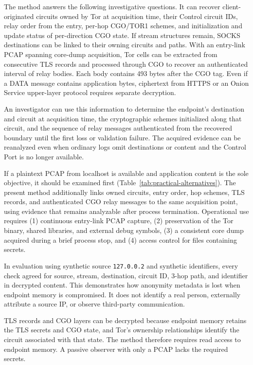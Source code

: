 \documentclass[10pt,a4paper]{article}
\newcommand{\code}[1]{\nolinkurl{#1}}
\newcommand{\torone}{\textsc{TOR1}}
\begin{document}
The method answers the following investigative questions.
It can recover client-originated circuits owned by Tor at acquisition time, their Control circuit IDs, relay order from the entry, per-hop CGO/\torone{} schemes, and initialization and update status of per-direction CGO state.
If stream structures remain, SOCKS destinations can be linked to their owning circuits and paths.
With an entry-link PCAP spanning core-dump acquisition, Tor cells can be extracted from consecutive TLS records and processed through CGO to recover an authenticated interval of relay bodies. Each body contains 493 bytes after the CGO tag. Even if a DATA message contains application bytes, ciphertext from HTTPS or an Onion Service upper-layer protocol requires separate decryption.

An investigator can use this information to determine the endpoint's destination and circuit at acquisition time, the cryptographic schemes initialized along that circuit, and the sequence of relay messages authenticated from the recovered boundary until the first loss or validation failure.
The acquired evidence can be reanalyzed even when ordinary logs omit destinations or content and the Control Port is no longer available.

If a plaintext PCAP from localhost is available and application content is the sole objective, it should be examined first (Table~\ref{tab:practical-alternatives}). The present method additionally links owned circuits, entry order, hop schemes, TLS records, and authenticated CGO relay messages to the same acquisition point, using evidence that remains analyzable after process termination. Operational use requires (1) continuous entry-link PCAP capture, (2) preservation of the Tor binary, shared libraries, and external debug symbols, (3) a consistent core dump acquired during a brief process stop, and (4) access control for files containing secrets.

In evaluation using synthetic source \code{127.0.0.2} and synthetic identifiers, every check agreed for source, stream, destination, circuit ID, 3-hop path, and identifier in decrypted content.
This demonstrates how anonymity metadata is lost when endpoint memory is compromised. It does not identify a real person, externally attribute a source IP, or observe third-party communication.


TLS records and CGO layers can be decrypted because endpoint memory retains the TLS secrets and CGO state, and Tor's ownership relationships identify the circuit associated with that state.
The method therefore requires read access to endpoint memory. A passive observer with only a PCAP lacks the required secrets.
\end{document}
